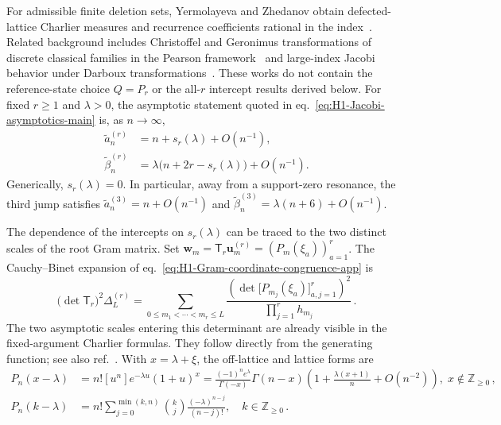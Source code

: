 \documentclass[a4paper,11pt]{article}
\def\ee{e}%
\theoremstyle{definition}
\theoremstyle{remark}
\newcommand{\ee}{\mathrm e}
\begin{document}
For admissible finite deletion sets, Yermolayeva and Zhedanov obtain defected-lattice Charlier measures and recurrence coefficients rational in the index~\cite{YermolayevaZhedanov1999}. Related background includes Christoffel and Geronimus transformations of discrete classical families in the Pearson framework~\cite{Manas2022Pearson} and large-index Jacobi behavior under Darboux transformations~\cite{BaileyDerevyagin2021}. These works do not contain the reference-state choice $Q=P_r$ or the all-$r$ intercept results derived below. For fixed $r\ge1$ and $\lambda>0$, the asymptotic statement quoted in eq.~\eqref{eq:H1-Jacobi-asymptotics-main} is, as $n\to\infty$,
\begin{equation}
\begin{aligned}
   \widetilde a_n^{(r)}
   &=n+s_r(\lambda)+O(n^{-1}),\\
   \widetilde\beta_n^{(r)}
   &=\lambda\bigl(n+2r-s_r(\lambda)\bigr)+O(n^{-1}).
\end{aligned}
   \label{eq:H1-general-r-Jacobi-asymptotics-app}
\end{equation}
Generically, $s_r(\lambda)=0$. In particular, away from a support-zero resonance, the third jump satisfies $\widetilde a_n^{(3)}=n+O(n^{-1})$ and $\widetilde\beta_n^{(3)}=\lambda(n+6)+O(n^{-1})$.

The dependence of the intercepts on $s_r(\lambda)$ can be traced to the two distinct scales of the root Gram matrix. Set $\mathbf w_m=\mathsf T_r\mathbf u_m^{(r)}=(P_m(\xi_a))_{a=1}^{r}$. The Cauchy--Binet expansion of eq.~\eqref{eq:H1-Gram-coordinate-congruence-app} is
\begin{equation}
   \bigl(\det\mathsf T_r\bigr)^2\Delta_L^{(r)}
   =
   \sum_{0\le m_1<\cdots<m_r\le L}
   \frac{
      \left(
      \det\!\bigl[P_{m_j}(\xi_a)\bigr]_{a,j=1}^{r}
      \right)^2
   }{
      \prod_{j=1}^{r}h_{m_j}
   }\,.
   \label{eq:H1-Cauchy-Binet-Delta-app}
\end{equation}
The two asymptotic scales entering this determinant are already visible in the fixed-argument Charlier formulas. They follow directly from the generating function; see also ref.~\cite{HuangLinZhao2021}. With $x=\lambda+\xi$, the off-lattice and lattice forms are 
\begin{align}
   P_n(x-\lambda)
   &=n![u^n]\ee^{-\lambda u}(1+u)^x
   =\frac{(-1)^n\ee^\lambda}{\Gamma(-x)}
   \Gamma(n-x)\left(1+\frac{\lambda(x+1)}{n}
   +O(n^{-2})\right),
   \; x\notin\mathbb Z_{\ge0}\,, \nonumber \\
   P_n(k-\lambda)
   &=n!\sum_{j=0}^{\min(k,n)}
   \binom{k}{j}\frac{(-\lambda)^{n-j}}{(n-j)!},
   \quad k\in\mathbb Z_{\ge0}\,.  \label{eq:H1-fixed-point-Charlier-asymptotics-app}
\end{align}
\end{document}
